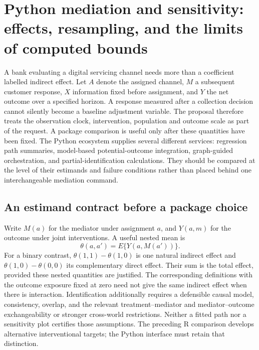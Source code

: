 \section[Python mediation and sensitivity contracts]{Python mediation and sensitivity: effects, resampling, and the limits of computed bounds}
\label{sec:exec25-pymed}

A bank evaluating a digital servicing channel needs more than a coefficient labelled indirect effect. Let $A$ denote the assigned channel, $M$ a subsequent customer response, $X$ information fixed before assignment, and $Y$ the net outcome over a specified horizon. A response measured after a collection decision cannot silently become a baseline adjustment variable. The proposal therefore treats the observation clock, intervention, population and outcome scale as part of the request. A package comparison is useful only after these quantities have been fixed. The Python ecosystem supplies several different services: regression path summaries, model-based potential-outcome integration, graph-guided orchestration, and partial-identification calculations. They should be compared at the level of their estimands and failure conditions rather than placed behind one interchangeable mediation command. \citep{exec25_pymed_statsmodels,exec25_pymed_pingouin,exec25_pymed_dowhy,exec25_pymed_process,exec25_pymed_choice}

\subsection{An estimand contract before a package choice}
Write $M(a)$ for the mediator under assignment $a$, and $Y(a,m)$ for the outcome under joint interventions. A useful nested mean is
\[
 \theta(a,a')=E\{Y(a,M(a'))\}.
\]
For a binary contrast, $\theta(1,1)-\theta(1,0)$ is one natural indirect effect and $\theta(1,0)-\theta(0,0)$ its complementary direct effect. Their sum is the total effect, provided these nested quantities are justified. The corresponding definitions with the outcome exposure fixed at zero need not give the same indirect effect when there is interaction. Identification additionally requires a defensible causal model, consistency, overlap, and the relevant treatment--mediator and mediator--outcome exchangeability or stronger cross-world restrictions. Neither a fitted path nor a sensitivity plot certifies those assumptions. The preceding R comparison develops alternative interventional targets; the Python interface must retain that distinction. \citep{exec25_pymed_choice,exec25_pymed_sharp_paper}

